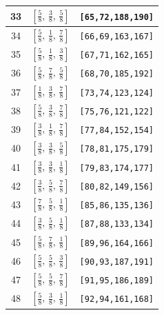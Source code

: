 \documentclass[fleqn,8pt]{jsarticle}
\begin{document}
\begin{longtable}{ccc}
33 & $\left[ \frac{5}{8},\, \frac{3}{8},\, \frac{5}{8} \right]$ & {\tt [65,72,188,190]} \\ \hline
34 & $\left[ \frac{5}{8},\, \frac{1}{8},\, \frac{7}{8} \right]$ & {\tt [66,69,163,167]} \\ \hline
35 & $\left[ \frac{5}{8},\, \frac{1}{8},\, \frac{3}{8} \right]$ & {\tt [67,71,162,165]} \\ \hline
36 & $\left[ \frac{5}{8},\, \frac{7}{8},\, \frac{5}{8} \right]$ & {\tt [68,70,185,192]} \\ \hline
37 & $\left[ \frac{1}{8},\, \frac{3}{8},\, \frac{7}{8} \right]$ & {\tt [73,74,123,124]} \\ \hline
38 & $\left[ \frac{5}{8},\, \frac{3}{8},\, \frac{7}{8} \right]$ & {\tt [75,76,121,122]} \\ \hline
39 & $\left[ \frac{3}{8},\, \frac{1}{8},\, \frac{7}{8} \right]$ & {\tt [77,84,152,154]} \\ \hline
40 & $\left[ \frac{3}{8},\, \frac{3}{8},\, \frac{5}{8} \right]$ & {\tt [78,81,175,179]} \\ \hline
41 & $\left[ \frac{3}{8},\, \frac{3}{8},\, \frac{1}{8} \right]$ & {\tt [79,83,174,177]} \\ \hline
42 & $\left[ \frac{3}{8},\, \frac{5}{8},\, \frac{7}{8} \right]$ & {\tt [80,82,149,156]} \\ \hline
43 & $\left[ \frac{7}{8},\, \frac{5}{8},\, \frac{1}{8} \right]$ & {\tt [85,86,135,136]} \\ \hline
44 & $\left[ \frac{3}{8},\, \frac{5}{8},\, \frac{1}{8} \right]$ & {\tt [87,88,133,134]} \\ \hline
45 & $\left[ \frac{5}{8},\, \frac{7}{8},\, \frac{1}{8} \right]$ & {\tt [89,96,164,166]} \\ \hline
46 & $\left[ \frac{5}{8},\, \frac{5}{8},\, \frac{3}{8} \right]$ & {\tt [90,93,187,191]} \\ \hline
47 & $\left[ \frac{5}{8},\, \frac{5}{8},\, \frac{7}{8} \right]$ & {\tt [91,95,186,189]} \\ \hline
48 & $\left[ \frac{5}{8},\, \frac{3}{8},\, \frac{1}{8} \right]$ & {\tt [92,94,161,168]} \\
\end{longtable}
\renewcommand{\arraystretch}{1.2}
\end{document}
